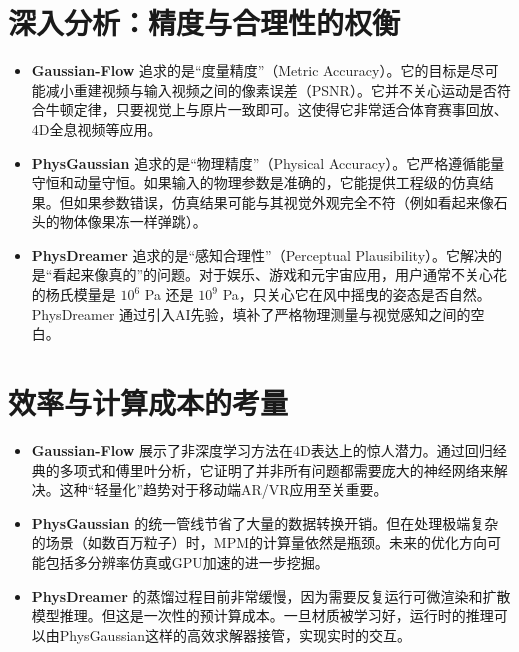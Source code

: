 \section{深入分析：精度与合理性的权衡}
\begin{itemize}
	\item \textbf{Gaussian-Flow}\cite{lin2024gaussianflow_cvpr} 追求的是“度量精度”（Metric Accuracy）。它的目标是尽可能减小重建视频与输入视频之间的像素误差（PSNR）。它并不关心运动是否符合牛顿定律，只要视觉上与原片一致即可。这使得它非常适合体育赛事回放、4D全息视频等应用。
	\item \textbf{PhysGaussian}\cite{xie2024physgaussian_cvpr} 追求的是“物理精度”（Physical Accuracy）。它严格遵循能量守恒和动量守恒。如果输入的物理参数是准确的，它能提供工程级的仿真结果。但如果参数错误，仿真结果可能与其视觉外观完全不符（例如看起来像石头的物体像果冻一样弹跳）。
	\item \textbf{PhysDreamer}\cite{li2024physdreamer_arxiv,li2024physdreamer_eccv} 追求的是“感知合理性”（Perceptual Plausibility）。它解决的是“看起来像真的”的问题。对于娱乐、游戏和元宇宙应用，用户通常不关心花的杨氏模量是 $10^6$ Pa 还是 $10^9$ Pa，只关心它在风中摇曳的姿态是否自然。PhysDreamer 通过引入AI先验，填补了严格物理测量与视觉感知之间的空白。
\end{itemize}

\section{效率与计算成本的考量}
\begin{itemize}
	\item \textbf{Gaussian-Flow}\cite{lin2024gaussianflow_cvpr} 展示了非深度学习方法在4D表达上的惊人潜力。通过回归经典的多项式和傅里叶分析，它证明了并非所有问题都需要庞大的神经网络来解决。这种“轻量化”趋势对于移动端AR/VR应用至关重要。
	\item \textbf{PhysGaussian}\cite{xie2024physgaussian_cvpr} 的统一管线节省了大量的数据转换开销。但在处理极端复杂的场景（如数百万粒子）时，MPM的计算量依然是瓶颈。未来的优化方向可能包括多分辨率仿真或GPU加速的进一步挖掘。
	\item \textbf{PhysDreamer}\cite{li2024physdreamer_arxiv,li2024physdreamer_eccv} 的蒸馏过程目前非常缓慢，因为需要反复运行可微渲染和扩散模型推理。但这是一次性的预计算成本。一旦材质被学习好，运行时的推理可以由PhysGaussian这样的高效求解器接管，实现实时的交互。
\end{itemize}
